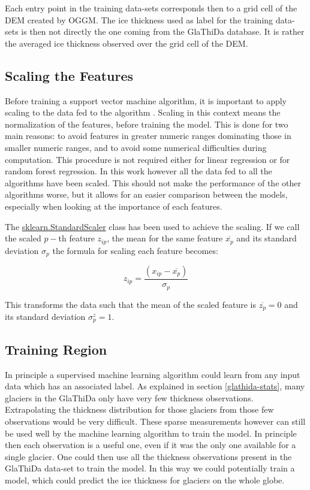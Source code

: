 Each entry point in the training data-sets corresponds then to a grid cell of the DEM created by OGGM. The ice thickness used as label for the training data-sets is then not directly the one coming from the GlaThiDa database. It is rather the averaged ice thickness observed over the grid cell of the DEM.

\subsection{Scaling the Features}
Before training a support vector machine algorithm, it is important to apply scaling to the data fed to the algorithm \citep{ScalingSVM2003}. Scaling in this context means the normalization of the features, before training the model. This is done for two main reasons: to avoid features in greater numeric ranges dominating those in smaller numeric ranges, and to avoid some numerical difficulties during computation. This procedure is not required either for linear regression or for random forest regression. In this work however all the data fed to all the algorithms have been scaled. This should not make the performance of the other algorithms worse, but it allows for an easier comparison between the models, especially when looking at the importance of each features.

The \href{https://scikit-learn.org/stable/modules/generated/sklearn.preprocessing.StandardScaler.html}{sklearn.StandardScaler} class has been used to achieve the scaling. If we call the scaled $p-$th feature $z_{ip}$, the mean for the same feature $\overline{x_p}$ and its standard deviation $\sigma_p$ the formula for scaling each feature becomes:

\begin{equation}\label{eq:scale}
z_{ip} = \frac{(x_{ip} - \overline{x_p})}{\sigma_p}
\end{equation}

This transforms the data such that the mean of the scaled feature is $\overline{z_p}=0$ and its standard deviation $\sigma^z_p=1$.

\subsection{Training Region}\label{alps}
In principle a supervised machine learning algorithm could learn from any input data which has an associated label. As explained in section \ref{glathida-stats}, many glaciers in the GlaThiDa only have very few thickness observations. Extrapolating the thickness distribution for those glaciers from those few observations would be very difficult. These sparse measurements however can still be used well by the machine learning algorithm to train the model. In principle then each observation is a useful one, even if it was the only one available for a single glacier. One could then use all the thickness observations present in the GlaThiDa data-set to train the model. In this way we could potentially train a model, which could predict the ice thickness for glaciers on the whole globe.

